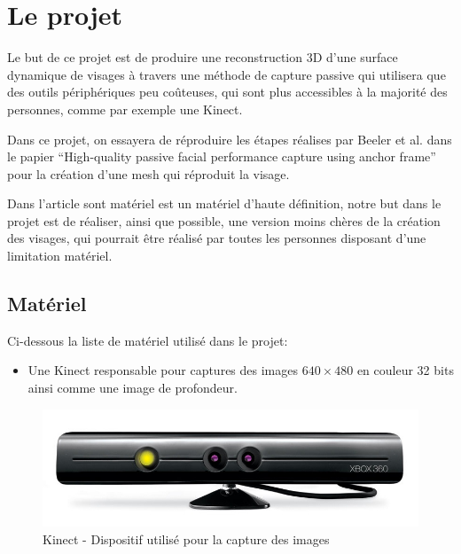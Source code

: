 \documentclass[a4paper,12pt]{article}
\begin{document}
\section{Le projet}

Le but de ce projet est de produire une reconstruction 3D d'une
surface dynamique de visages à travers une méthode de capture passive
qui utilisera que des outils périphériques peu coûteuses, qui sont
plus accessibles à la majorité des personnes, comme par exemple une Kinect.

Dans ce projet, on essayera de réproduire les étapes réalises par
Beeler et al. dans le papier ``High-quality passive facial performance
capture using anchor frame''\cite{Beeler:2011:HPF:2010324.1964970}
pour la création d'une mesh qui réproduit la visage. 

Dans l'article sont matériel est un matériel d'haute définition, notre
but dans le projet est de réaliser, ainsi que possible, une version
moins chères de la création des visages, qui pourrait être réalisé par
toutes les personnes disposant d'une limitation matériel. 

\subsection{Matériel}

Ci-dessous la liste de matériel utilisé dans le projet: 

\begin{itemize}
\item Une Kinect responsable pour captures des images $640 \times 480$ en
  couleur 32 bits ainsi comme une image de profondeur.  
\end{itemize}

\begin{figure}[h!]
  \begin{center}
    \includegraphics[scale=0.2]{img/kinect.jpg}
    \caption{Kinect - Dispositif utilisé pour la capture des images}
  \end{center}
\end{figure}
\end{document}

